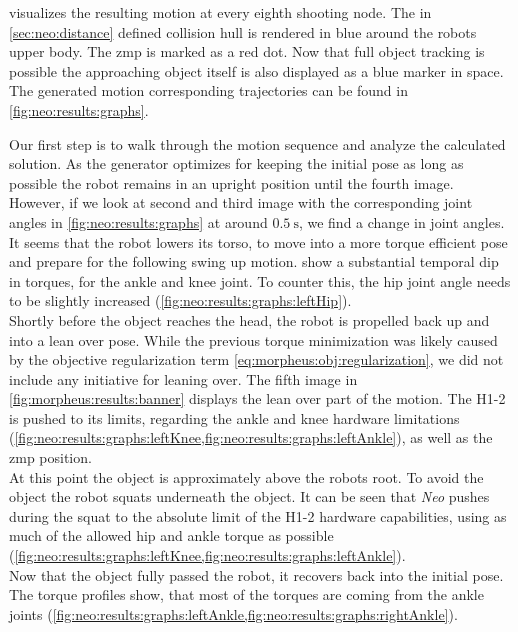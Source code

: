  visualizes the resulting motion at every eighth shooting node.
The in \cref{sec:neo:distance} defined collision hull is rendered in blue around the robots upper body.
The \acrshort{zmp} is marked as a red dot.
Now that full object tracking is possible the approaching object itself is also displayed as a blue marker in space.
The generated motion corresponding trajectories can be found in \cref{fig:neo:results:graphs}.
\par
Our first step is to walk through the motion sequence and analyze the calculated solution.
As the generator optimizes for keeping the initial pose as long as possible the robot remains in an upright position until the fourth image.
However, if we look at second and third image with the corresponding joint angles in \cref{fig:neo:results:graphs} at around $\SI{0.5}{\s}$, we find a change in joint angles.
It seems that the robot lowers its torso, to move into a more torque efficient pose and prepare for the following swing up motion.
 show a substantial temporal dip in torques, for the ankle and knee joint.
To counter this, the hip joint angle needs to be slightly increased (\cref{fig:neo:results:graphs:leftHip}).
\\
Shortly before the object reaches the head, the robot is propelled back up and into a lean over pose.
While the previous torque minimization was likely caused by the objective regularization term \cref{eq:morpheus:obj:regularization}, we did not include any initiative for leaning over.
The fifth image in \cref{fig:morpheus:results:banner} displays the lean over part of the motion.
The H1-2 is pushed to its limits, regarding the ankle and knee hardware limitations (\cref{fig:neo:results:graphs:leftKnee,fig:neo:results:graphs:leftAnkle}), as well as the \acrshort{zmp} position.
\\
At this point the object is approximately above the robots root.
To avoid the object the robot squats underneath the object.
It can be seen that \textit{Neo} pushes during the squat to the absolute limit of the H1-2 hardware capabilities, using as much of the allowed hip and ankle torque as possible (\cref{fig:neo:results:graphs:leftKnee,fig:neo:results:graphs:leftAnkle}).
\\
Now that the object fully passed the robot, it recovers back into the initial pose.
The torque profiles show, that most of the torques are coming from the ankle joints (\cref{fig:neo:results:graphs:leftAnkle,fig:neo:results:graphs:rightAnkle}).
